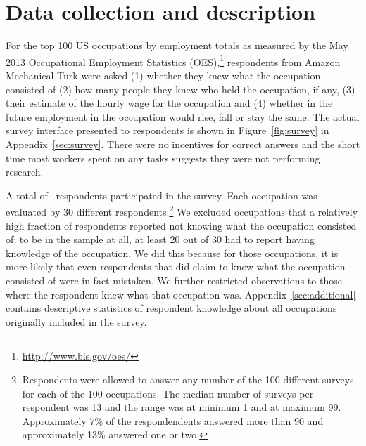\documentclass[12pt]{article}
\begin{document}

\section{Data collection and description} 

For the top 100 US occupations by employment totals as measured by the May 2013 Occupational Employment Statistics (OES),\footnote{\url{http://www.bls.gov/oes/}}  respondents from Amazon Mechanical Turk were asked
(1) whether they knew what the occupation consisted of 
(2) how many people they knew who held the occupation, if any,  
(3) their estimate of the hourly wage for the occupation
and (4) whether in the future employment in the occupation would rise, fall or stay the same.
The actual survey interface presented to respondents is shown in Figure~\ref{fig:survey} in Appendix~\ref{sec:survey}. 
There were no incentives for correct answers and the short time most workers spent on any tasks suggests they were not performing research. 

A total of \numRaters\, respondents participated in the survey. 
Each occupation was evaluated by 30 different respondents.\footnote
{
Respondents were allowed to answer any number of the 100 different surveys for each of the 100 occupations. The median number of surveys per respondent was 13 and the range was at minimum 1 and at maximum 99. Approximately 7\% of the respondendents answered more than 90 and approximately 13\% answered one or two. 
}
We excluded occupations that a relatively high fraction of respondents reported not knowing what the occupation consisted of: 
to be in the sample at all, at least 20 out of 30 had to report having knowledge of the occupation.
We did this because for those occupations, it is more likely that even respondents that did claim to know what the occupation consisted of were in fact mistaken.  
We further restricted observations to those where the respondent knew what that occupation was. 
Appendix~\ref{sec:additional} contains descriptive statistics of respondent knowledge about all occupations originally included in the survey.   
\end{document}
